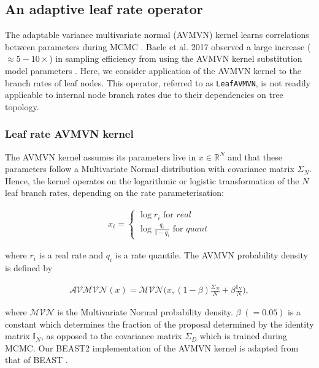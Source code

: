 \documentclass[10pt,letterpaper]{article}
\begin{document}
\clearpage
\subsection*{An adaptive leaf rate operator}
\label{AVMVN_sect}

The adaptable variance multivariate normal (AVMVN) kernel  learns correlations between parameters during MCMC \cite{baele2017adaptive,suchard2018bayesian}. 
Baele et al. 2017  observed a large increase ($\approx 5-10 \times$) in sampling efficiency from using the AVMVN kernel substitution model parameters \cite{baele2017adaptive}.  
Here, we consider application of the AVMVN kernel to the branch rates of leaf nodes. 
This operator, referred to as \texttt{LeafAVMVN}, is not readily applicable to internal node branch rates due to their dependencies on tree topology.  




\subsubsection*{Leaf rate AVMVN kernel}


The AVMVN kernel assumes its parameters live in $x \in \mathbb{R}^N$ and that these parameters follow a Multivariate Normal distribution with covariance matrix $\Sigma_N$. Hence, the kernel operates on the logarithmic or logistic transformation of the $N$ leaf branch rates, depending on the rate parameterisation:

\begin{align}
	x_i = \begin{cases} \log r_i \text{ for } \textit{real} \\
						\log \frac{q_i}{1 - q_i} \text{ for } \textit{quant}  \end{cases}
\end{align}

where $r_i$ is a real rate and $q_i$ is a rate quantile. The AVMVN probability density is defined by 


\begin{align}
	\mathcal{AVMVN}(x) =  \mathcal{MVN}\big(x, (1-\beta) \frac{\Sigma_N}{N} + \beta \frac{\mathbb{I}_N}{N} \big) ,
\end{align}


where $\mathcal{MVN}$ is the Multivariate Normal probability density. $\beta \; (= 0.05)$ is a constant which determines the fraction of the proposal determined by the identity matrix $\mathbb{I}_N$, as opposed to the covariance matrix $\Sigma_D$ which is trained during MCMC.
Our BEAST2 implementation of the AVMVN kernel is adapted from that of BEAST \cite{suchard2018bayesian}.
\end{document}
